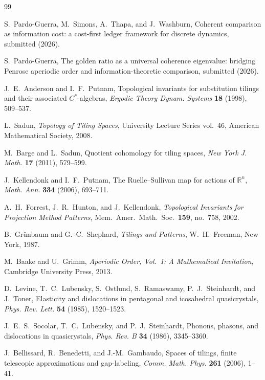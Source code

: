 \documentclass[12pt]{article}
\theoremstyle{definition}
\theoremstyle{remark}
\begin{document}
\begin{thebibliography}{99}

S.~Pardo-Guerra, M.~Simons, A.~Thapa, and J.~Washburn,
Coherent comparison as information cost: a cost-first ledger framework for discrete dynamics,
submitted (2026).

S.~Pardo-Guerra,
The golden ratio as a universal coherence eigenvalue: bridging Penrose aperiodic order and information-theoretic comparison,
submitted (2026).

J.~E.~Anderson and I.~F.~Putnam,
Topological invariants for substitution tilings and their associated $C^*$-algebras,
\emph{Ergodic Theory Dynam. Systems} \textbf{18} (1998), 509--537.

L.~Sadun,
\emph{Topology of Tiling Spaces},
University Lecture Series vol.~46, American Mathematical Society, 2008.

M.~Barge and L.~Sadun,
Quotient cohomology for tiling spaces,
\emph{New York J. Math.} \textbf{17} (2011), 579--599.

J.~Kellendonk and I.~F.~Putnam,
The Ruelle--Sullivan map for actions of $\mathbb{R}^n$,
\emph{Math. Ann.} \textbf{334} (2006), 693--711.

A.~H.~Forrest, J.~R.~Hunton, and J.~Kellendonk,
\emph{Topological Invariants for Projection Method Patterns},
Mem.\ Amer.\ Math.\ Soc.\ \textbf{159}, no.~758, 2002.

B.~Gr\"{u}nbaum and G.~C.~Shephard,
\emph{Tilings and Patterns}, W.~H.~Freeman, New York, 1987.

M.~Baake and U.~Grimm,
\emph{Aperiodic Order, Vol.~1: A Mathematical Invitation},
Cambridge University Press, 2013.

D.~Levine, T.~C.~Lubensky, S.~Ostlund, S.~Ramaswamy, P.~J.~Steinhardt, and J.~Toner,
Elasticity and dislocations in pentagonal and icosahedral quasicrystals,
\emph{Phys. Rev. Lett.} \textbf{54} (1985), 1520--1523.

J.~E.~S.~Socolar, T.~C.~Lubensky, and P.~J.~Steinhardt,
Phonons, phasons, and dislocations in quasicrystals,
\emph{Phys. Rev. B} \textbf{34} (1986), 3345--3360.

J.~Bellissard, R.~Benedetti, and J.-M.~Gambaudo,
Spaces of tilings, finite telescopic approximations and gap-labeling,
\emph{Comm. Math. Phys.} \textbf{261} (2006), 1--41.

\end{thebibliography}
\end{document}

